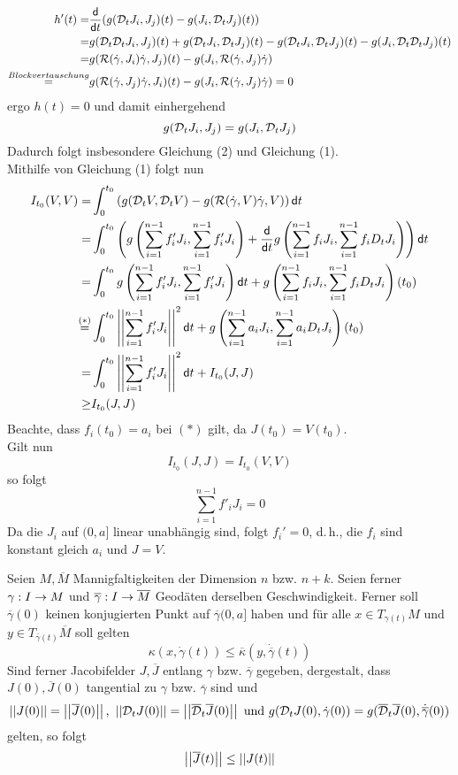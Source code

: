 \documentclass{book}
\renewcommand{\d}{\textsf{d}}
\renewcommand{\l}[1]{\overline{#1}}
\newcommand{\Rc}{\mathcal{R}}
\begin{document}
\begin{Beweis}{}
\begin{align*}
{h}'(t) =& \frac{\d}{\d t}(g(\D_t J_i, J_j)(t) - g(J_i, \D_t J_j)(t))\\
=& g(\D_t\D_t J_i, J_j)(t) +  g(\D_t J_i, \D_t J_j)(t) - g(\D_tJ_i, \D_t J_j)(t) -g(J_i, \D_t\D_t J_j)(t)\\
=& g(\Rc(\dot{\gamma}, J_i) \dot{\gamma}, J_j)(t) - g(J_i, \Rc(\dot{\gamma}, J_j) \dot{\gamma} )\\
\gl{Blockvertauschung}& g(\Rc(\dot{\gamma}, J_j) \dot{\gamma}, J_i)(t) - g(J_i, \Rc(\dot{\gamma}, J_j) \dot{\gamma} ) = 0
\end{align*}
ergo $h(t) = 0$ und damit einhergehend
\[ g(\mathcal{D}_t J_i, J_j) = g(J_i, \mathcal{D}_t J_j) \]
Dadurch folgt insbesondere Gleichung (2) und Gleichung (1).\\
Mithilfe von Gleichung (1) folgt nun
\begin{align*}
I_{t_0}(V,V) =& \int_{0}^{t_0} \klam{ g(\D_tV, \D_tV) - g(\Rc(\dot{\gamma}, V)\dot{\gamma}, V ) } \d t \\
=&\int_{0}^{t_0} \klam{ g\klam{ \sum_{i = 1}^{n-1} f_i' J_i, \sum_{i = 1}^{n-1} f_i' J_i }
+ \frac{\d}{\d t} g
\klam{ \sum_{i = 1}^{n-1} f_i J_i, \sum_{i = 1}^{n - 1} f_i D_tJ_i } } \d t \\
=&\int_{0}^{t_0}  g\klam{ \sum_{i = 1}^{n-1} f_i' J_i, \sum_{i = 1}^{n-1} f_i' J_i } \d t
+
g\klam{ \sum_{i = 1}^{n-1} f_i J_i, \sum_{i = 1}^{n - 1} f_i D_tJ_i } (t_0)\\
\gl{(*)}&\int_{0}^{t_0}  \norm{\sum_{i = 1}^{n-1} f_i' J_i}^2 \d t
+
g\klam{ \sum_{i = 1}^{n-1} a_i J_i, \sum_{i = 1}^{n - 1} a_i D_tJ_i } (t_0)\\
=& \int_{0}^{t_0}  \norm{\sum_{i = 1}^{n-1} f_i' J_i}^2 \d t
+ I_{t_0}(J,J)
\\
\geq & I_{t_0} (J,J)
\end{align*}
Beachte, dass $f_i(t_0) = a_i$ bei $(*)$ gilt, da $J(t_0) = V(t_0)$.\\
Gilt nun
\[ I_{t_0}(J,J) = I_{t_0}(V,V) \]
so folgt
\[ \sum_{i = 1}^{n-1}f'_i J_i = 0 \]
Da die $J_i$ auf $(0,a]$ linear unabhängig sind, folgt $f_i' = 0$, d.\,h., die $f_i$ sind konstant gleich $a_i$ und $J = V$.
\end{Beweis}

Seien $M, \l M$ Mannigfaltigkeiten der Dimension $n$ bzw. $n + k$. Seien ferner $\gamma : I \overset{}{\rightarrow}M $ und $\l \gamma : I \pfeil{} \l M$ Geodäten derselben Geschwindigkeit. Ferner soll $\l \gamma(0)$ keinen konjugierten Punkt auf $\l \gamma (0,a]$ haben und für alle $x \in T_{\gamma(t)} M$ und $y \in T_{\l \gamma (t)} \l M$ soll gelten
\[ \kappa(x, \dot{\gamma}(t)) \leq \l\kappa(y, \dot{\l \gamma}(t)) \] 
Sind ferner Jacobifelder $J,\l J$ entlang $\gamma$ bzw. $\l \gamma$ gegeben, dergestalt, dass $J(0), \l J(0)$ tangential zu $\gamma$ bzw. $\l \gamma$ sind und
\begin{align*}
\norm{J(0)} = \norm{\l J(0)} \text{, } \norm{\D_tJ(0)} = \norm{\l \D_t \l J(0)} \text{ und } g(\D_t J(0),\dot{\gamma}(0)) = g(\l\D_t\l J(0), \dot{\l \gamma}(0))
\end{align*}
gelten, so folgt
\[ \norm{\l J(t)} \leq \norm{J(t)} \]
\end{document}
